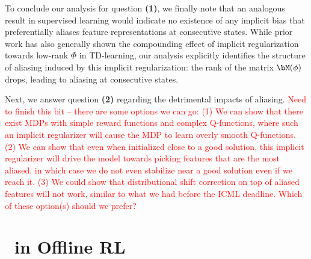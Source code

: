 To conclude our analysis for question \textbf{(1)}, we finally note that an analogous result in supervised learning would indicate no existence of any implicit bias that preferentially aliases feature representations at consecutive states. While prior work \citep{kumar2021implicit} has also generally shown the compounding effect of implicit regularization towards low-rank $\Phi$ in TD-learning, our analysis explicitly identifies the structure of aliasing induced by this implicit regularization: the rank of the matrix $\bM(\phi)$ drops, leading to aliasing at consecutive states.

Next, we answer question \textbf{(2)} regarding the detrimental impacts of aliasing. 
\textcolor{red}{Need to finish this bit -- there are some options we can go: (1) We can show that there exist MDPs with simple reward functions and complex Q-functions, where such an implicit regularizer will cause the MDP to learn overly smooth Q-functions. (2) We can show that even when initialized close to a good solution, this implicit regularizer will drive the model towards picking features that are the most aliased, in which case we do not even stabilize near a good solution even if we reach it. (3) We could show that distributional shift correction on top of aliased features will not work, similar to what we had before the ICML deadline. Which of these option(s) should we prefer?}

\fi























\iffalse
\section{\AliasingProblemName\ in Offline RL}
\label{sec:problem}

